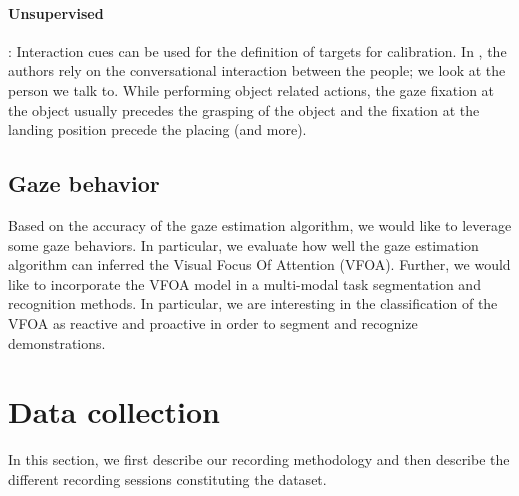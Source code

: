 \documentclass[11pt,a4paper]{article}
\begin{document}
\paragraph{Unsupervised}: Interaction cues can be used for the definition of targets for calibration. In \cite{Siegfried2017}, the authors rely on the conversational interaction between the people; we look at the person we talk to. While performing object related actions, the gaze fixation at the object usually precedes the grasping of the object and the fixation at the landing position precede the placing \cite{Land2009} (and more).

\subsection{Gaze behavior}
Based on the accuracy of the gaze estimation algorithm, we would like to leverage some gaze behaviors. In particular, we evaluate how well the gaze estimation algorithm can inferred the Visual Focus Of Attention (VFOA). Further, we would like to incorporate the VFOA model in a multi-modal task segmentation and recognition methods. In particular, we are interesting in the classification of the VFOA as reactive and proactive in order to segment and recognize demonstrations.

\section{Data collection}
\label{Data_Collection}
In this section, we first describe our recording methodology and then describe the different recording sessions constituting the dataset.
\end{document}
